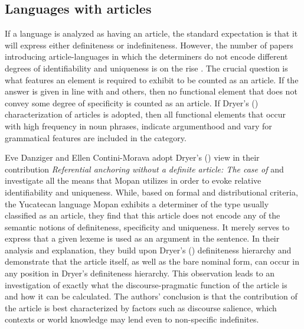 \documentclass[output=paper]{langsci/langscibook}
\begin{document}
\subsection{Languages with articles}

If a language is analyzed as having an article, the standard expectation is that it will express either definiteness or indefiniteness. However, the number of papers introducing article-languages in which the determiners do not encode different degrees of identifiability and uniqueness is on the rise \citep[e.\,g.,][]{lyon:15}. The crucial question is what features an element is required to exhibit to be counted as an article. If the answer is given in line with \citet{himmelmann:01} and others, then no functional element that does not convey some degree of specificity is counted as an article. If Dryer's (\citeyear{dryer:14}) characterization of articles is adopted, then all functional elements that occur with high frequency in noun phrases, indicate argumenthood and vary for grammatical features are included in the category.

Eve Danziger and Ellen Contini-Morava 
adopt Dryer's (\citeyear{dryer:14}) view in their contribution {\emph{Referential anchoring without a definite article: The case of }} and investigate all the means that Mopan utilizes in order to evoke relative identifiability and uniqueness. While, based on formal and distributional criteria, the Yucatecan language  Mopan exhibits a determiner of the type usually classified as an article, they find that this article does not encode any of the semantic notions of definiteness, specificity and uniqueness.  It merely serves to express that a given lexeme is used as an argument in the sentence. In their analysis and explanation, they build upon Dryer's (\citeyear{dryer:14}) definiteness hierarchy and demonstrate that the article itself, as well as the bare nominal form, can occur in any position in Dryer's definiteness hierarchy. This observation leads to an investigation of exactly what the discourse-pragmatic function of the article is and how it can be calculated. The authors' conclusion is that the contribution of the article is best characterized by factors such as discourse salience, which contexts or world knowledge may lend even to non-specific indefinites. 
\end{document}
